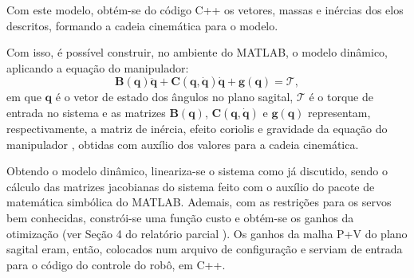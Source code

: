 Com este modelo, obtém-se do código C++ os vetores, massas e inércias dos elos descritos, formando a cadeia cinemática para o modelo. 

Com isso, é possível construir, no ambiente do MATLAB, o modelo dinâmico, aplicando a equação do manipulador:
\begin{equation}
\label{eq:dinamica}
\mathbf{B(q)} \ddot{\mathbf{q}} + \mathbf{C}(\mathbf{q}, \dot{\mathbf{q}}) \dot{\mathbf{q}} + \mathbf{g(q)} = \boldsymbol{\mathcal{T}},
\end{equation}
em que $\mathbf{q}$ é o vetor de estado dos ângulos no plano sagital, $\boldsymbol{\mathcal{T}}$ é o torque de entrada no sistema e as matrizes $\mathbf{B(q)}$, $\mathbf{C}(\mathbf{q}, \dot{\mathbf{q}})$ e $\mathbf{g(q)}$ representam, respectivamente, a matriz de inércia, efeito coriolis e gravidade da equação do manipulador \cite{10.5555/1965405}, obtidas com auxílio dos valores para a cadeia cinemática. 

Obtendo o modelo dinâmico, lineariza-se o sistema como já discutido, sendo o cálculo das matrizes jacobianas do sistema feito com o auxílio do pacote de matemática simbólica do MATLAB. Ademais, com as restrições para os servos bem conhecidas, constrói-se uma função custo e obtém-se os ganhos da otimização (ver Seção 4 do relatório parcial \cite{parcial}). Os ganhos da malha P+V do plano sagital eram, então, colocados num arquivo de configuração e serviam de entrada para o código do controle do robô, em C++.

